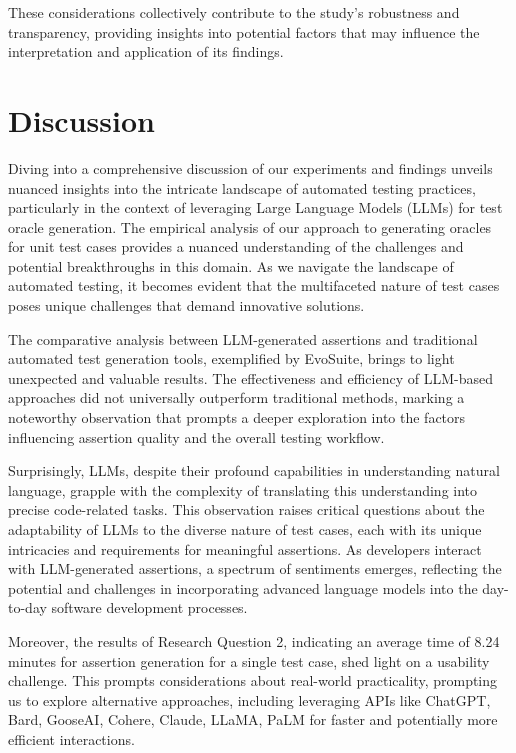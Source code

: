 These considerations collectively contribute to the study's robustness and transparency, providing insights into potential factors that may influence the interpretation and application of its findings.

\section{Discussion}
\label{sec:discussion}
\vspace{0.2 cm}

Diving into a comprehensive discussion of our experiments and findings unveils nuanced insights into the intricate landscape of automated testing practices, particularly in the context of leveraging Large Language Models (LLMs) for test oracle generation. The empirical analysis of our approach to generating oracles for unit test cases provides a nuanced understanding of the challenges and potential breakthroughs in this domain. As we navigate the landscape of automated testing, it becomes evident that the multifaceted nature of test cases poses unique challenges that demand innovative solutions.

The comparative analysis between LLM-generated assertions and traditional automated test generation tools, exemplified by EvoSuite, brings to light unexpected and valuable results. The effectiveness and efficiency of LLM-based approaches did not universally outperform traditional methods, marking a noteworthy observation that prompts a deeper exploration into the factors influencing assertion quality and the overall testing workflow.

Surprisingly, LLMs, despite their profound capabilities in understanding natural language, grapple with the complexity of translating this understanding into precise code-related tasks. This observation raises critical questions about the adaptability of LLMs to the diverse nature of test cases, each with its unique intricacies and requirements for meaningful assertions. As developers interact with LLM-generated assertions, a spectrum of sentiments emerges, reflecting the potential and challenges in incorporating advanced language models into the day-to-day software development processes.

Moreover, the results of Research Question 2, indicating an average time of 8.24 minutes for assertion generation for a single test case, shed light on a usability challenge. This prompts considerations about real-world practicality, prompting us to explore alternative approaches, including leveraging APIs like ChatGPT\cite{chatgpt}, Bard\cite{bard}, GooseAI\cite{gooseai}, Cohere\cite{cohere}, Claude\cite{claude}, LLaMA\cite{LLaMA}, PaLM\cite{palm} for faster and potentially more efficient interactions.


